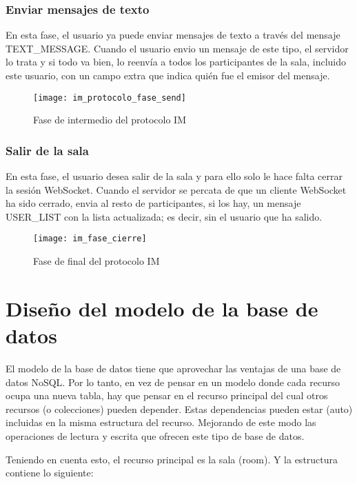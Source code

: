 \subsubsection{Enviar mensajes de texto}

En esta fase, el usuario ya puede enviar mensajes de texto a través del mensaje TEXT\_MESSAGE. Cuando el usuario envio un mensaje de este tipo, el servidor lo trata y si todo va bien, lo reenvía a todos los participantes de la sala, incluido este usuario, con un campo extra que indica quién fue el emisor del mensaje.

\begin{figure}[htp!]
  \centering
  \texttt{[image: im\_protocolo\_fase\_send]}
  \caption{Fase de intermedio del protocolo IM}
  \label{fig:im_protocolo_fase_send}
\end{figure}

\subsubsection{Salir de la sala}

En esta fase, el usuario desea salir de la sala y para ello solo le hace falta cerrar la sesión WebSocket. Cuando el servidor se percata de que un cliente WebSocket ha sido cerrado, envia al resto de participantes, si los hay, un mensaje USER\_LIST con la lista actualizada; es decir, sin el usuario que ha salido.

\begin{figure}[htp!]
  \centering
  \texttt{[image: im\_fase\_cierre]}
  \caption{Fase de final del protocolo IM}
  \label{fig:im_fase_cierre}
\end{figure}

\section{Diseño del modelo de la base de datos}

El modelo de la base de datos tiene que aprovechar las ventajas de una base de datos NoSQL. Por lo tanto, en vez de pensar en un modelo donde cada recurso ocupa una nueva tabla, hay que pensar en el recurso principal del cual otros recursos (o colecciones) pueden depender. Estas dependencias pueden estar (auto) incluidas en la misma estructura del recurso. Mejorando de este modo las operaciones de lectura y escrita que ofrecen este tipo de base de datos.

Teniendo en cuenta esto, el recurso principal es la sala (room). Y la estructura contiene lo siguiente:

